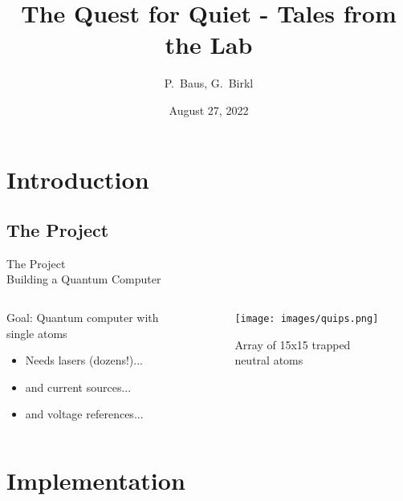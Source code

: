 \documentclass[color={accentcolor=1b}, authorontitle=true]{tudabeamer}
\date{August 27, 2022}
\title{The Quest for Quiet - Tales from the Lab}
\author[P. Baus et al.]{P.~Baus, G.~Birkl}
\institute{Institut für Angewandte Physik and GSI ARTEMIS}
\begin{document}

\maketitle

\section{Introduction}
\subsection{The Project}
\begin{frame}{The Project\\\textnormal{\small{Building a Quantum Computer}}}
    \begin{columns}[T] %
        \begin{column}{.48\textwidth}
            Goal: Quantum computer with single atoms
            \begin{itemize}
                \item Needs lasers (dozens!)...
                \item and current sources...
                \item and voltage references...
            \end{itemize}
        \end{column}
        \hfill
        \begin{column}{.48\textwidth}
            \begin{figure}[h]
                \texttt{[image: images/quips.png]}
                \caption{Array of 15x15 trapped neutral atoms}
            \end{figure}
        \end{column}
    \end{columns}
\end{frame}

\section{Implementation}
\end{document}
